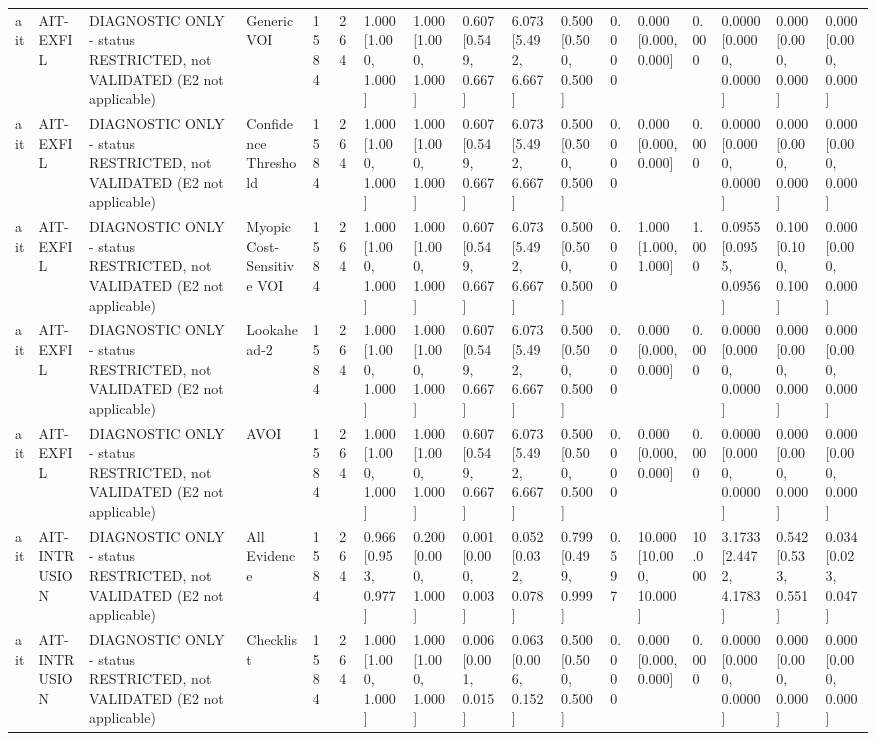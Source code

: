 \begin{table}[!ht]
{\begin{tabular}{lllllllllllllllll}
ait & AIT-EXFIL & DIAGNOSTIC ONLY - status RESTRICTED, not VALIDATED (E2 not applicable) & Generic VOI & 1584 & 264 & 1.000 [1.000, 1.000] & 1.000 [1.000, 1.000] & 0.607 [0.549, 0.667] & 6.073 [5.492, 6.667] & 0.500 [0.500, 0.500] & 0.000 & 0.000 [0.000, 0.000] & 0.000 & 0.0000 [0.0000, 0.0000] & 0.000 [0.000, 0.000] & 0.000 [0.000, 0.000] \\
ait & AIT-EXFIL & DIAGNOSTIC ONLY - status RESTRICTED, not VALIDATED (E2 not applicable) & Confidence Threshold & 1584 & 264 & 1.000 [1.000, 1.000] & 1.000 [1.000, 1.000] & 0.607 [0.549, 0.667] & 6.073 [5.492, 6.667] & 0.500 [0.500, 0.500] & 0.000 & 0.000 [0.000, 0.000] & 0.000 & 0.0000 [0.0000, 0.0000] & 0.000 [0.000, 0.000] & 0.000 [0.000, 0.000] \\
ait & AIT-EXFIL & DIAGNOSTIC ONLY - status RESTRICTED, not VALIDATED (E2 not applicable) & Myopic Cost-Sensitive VOI & 1584 & 264 & 1.000 [1.000, 1.000] & 1.000 [1.000, 1.000] & 0.607 [0.549, 0.667] & 6.073 [5.492, 6.667] & 0.500 [0.500, 0.500] & 0.000 & 1.000 [1.000, 1.000] & 1.000 & 0.0955 [0.0955, 0.0956] & 0.100 [0.100, 0.100] & 0.000 [0.000, 0.000] \\
ait & AIT-EXFIL & DIAGNOSTIC ONLY - status RESTRICTED, not VALIDATED (E2 not applicable) & Lookahead-2 & 1584 & 264 & 1.000 [1.000, 1.000] & 1.000 [1.000, 1.000] & 0.607 [0.549, 0.667] & 6.073 [5.492, 6.667] & 0.500 [0.500, 0.500] & 0.000 & 0.000 [0.000, 0.000] & 0.000 & 0.0000 [0.0000, 0.0000] & 0.000 [0.000, 0.000] & 0.000 [0.000, 0.000] \\
ait & AIT-EXFIL & DIAGNOSTIC ONLY - status RESTRICTED, not VALIDATED (E2 not applicable) & AVOI & 1584 & 264 & 1.000 [1.000, 1.000] & 1.000 [1.000, 1.000] & 0.607 [0.549, 0.667] & 6.073 [5.492, 6.667] & 0.500 [0.500, 0.500] & 0.000 & 0.000 [0.000, 0.000] & 0.000 & 0.0000 [0.0000, 0.0000] & 0.000 [0.000, 0.000] & 0.000 [0.000, 0.000] \\
ait & AIT-INTRUSION & DIAGNOSTIC ONLY - status RESTRICTED, not VALIDATED (E2 not applicable) & All Evidence & 1584 & 264 & 0.966 [0.953, 0.977] & 0.200 [0.000, 1.000] & 0.001 [0.000, 0.003] & 0.052 [0.032, 0.078] & 0.799 [0.499, 0.999] & 0.597 & 10.000 [10.000, 10.000] & 10.000 & 3.1733 [2.4472, 4.1783] & 0.542 [0.533, 0.551] & 0.034 [0.023, 0.047] \\
ait & AIT-INTRUSION & DIAGNOSTIC ONLY - status RESTRICTED, not VALIDATED (E2 not applicable) & Checklist & 1584 & 264 & 1.000 [1.000, 1.000] & 1.000 [1.000, 1.000] & 0.006 [0.001, 0.015] & 0.063 [0.006, 0.152] & 0.500 [0.500, 0.500] & 0.000 & 0.000 [0.000, 0.000] & 0.000 & 0.0000 [0.0000, 0.0000] & 0.000 [0.000, 0.000] & 0.000 [0.000, 0.000] \\

\end{tabular}}
\end{table}
